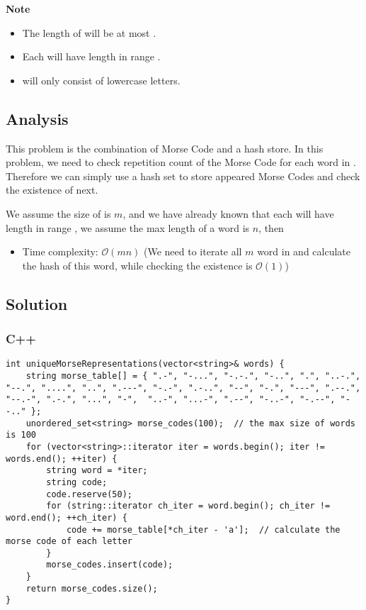 \textbf{Note}
\begin{itemize}
    \item The length of  will be at most .
    \item Each  will have length in range \inlinecode{[1, 12]}.
    \item {} will only consist of lowercase letters.
\end{itemize}

\subsection*{Analysis}
This problem is the combination of Morse Code and a hash store. In this problem, we need to check repetition count of the Morse Code for each word in . Therefore we can simply use a hash set to store appeared Morse Codes and check the existence of next.

We assume the size of  is $m$, and we have already known that each  will have length in range \inlinecode{[1, 12]}, we assume the max length of a word is $n$, then
\begin{itemize}
\item Time complexity: $\mathcal{O}(mn)$ (We need to iterate all $m$ word in  and calculate the hash of this word, while checking the existence is $\mathcal{O}(1)$)
\end{itemize}

\subsection*{Solution}
\subsubsection*{C++}
\begin{verbatim}
int uniqueMorseRepresentations(vector<string>& words) {
    string morse_table[] = { ".-", "-...", "-.-.", "-..", ".", "..-.", "--.", "....", "..", ".---", "-.-", ".-..", "--", "-.", "---", ".--.", "--.-", ".-.", "...", "-",  "..-", "...-", ".--", "-..-", "-.--", "--.." };
    unordered_set<string> morse_codes(100);  // the max size of words is 100
    for (vector<string>::iterator iter = words.begin(); iter != words.end(); ++iter) {
        string word = *iter;
        string code;
        code.reserve(50);
        for (string::iterator ch_iter = word.begin(); ch_iter != word.end(); ++ch_iter) {
            code += morse_table[*ch_iter - 'a'];  // calculate the morse code of each letter
        }
        morse_codes.insert(code);
    }
    return morse_codes.size();
}
\end{verbatim}

\newpage

